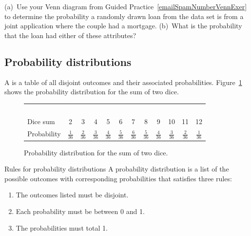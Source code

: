 \begin{exercisewrap}
\begin{nexercise}
(a)~Use your Venn diagram from Guided Practice~\ref{emailSpamNumberVennExer} to determine the
probability a randomly drawn loan from the 
data set is from a joint application where the couple had
a mortgage.
(b)~What is the probability that the loan had either of
these attributes?\footnotemark
\end{nexercise}
\end{exercisewrap}



\subsection{Probability distributions}


A  is a table of all disjoint outcomes and their associated probabilities. Figure~\ref{diceProb} shows the probability distribution for the sum of two dice. 

\begin{figure}[h] \small
\centering
\begin{tabular}{l ccc ccc ccc cc}
  \hline
  \ \vspace{-3mm} \\
Dice sum\vspace{0.3mm} & 2 & 3 & 4 & 5 & 6 & 7 & 8 & 9 & 10 & 11 & 12  \\
Probability & $\frac{1}{36}$ & $\frac{2}{36}$ & $\frac{3}{36}$ & $\frac{4}{36}$ & $\frac{5}{36}$ & $\frac{6}{36}$ & $\frac{5}{36}$ & $\frac{4}{36}$ & $\frac{3}{36}$ & $\frac{2}{36}$ & $\frac{1}{36}$\vspace{1mm} \\
   \hline
\end{tabular}
\caption{Probability distribution for the sum of two dice.}
\label{diceProb}
\end{figure}

\begin{onebox}{Rules for probability distributions}
A probability distribution is a list of the possible outcomes with corresponding probabilities that satisfies three rules: \vspace{-2mm}
\begin{enumerate}
\setlength{\itemsep}{0mm}
\item The outcomes listed must be disjoint.
\item Each probability must be between 0 and 1.
\item The probabilities must total 1. \vspace{1mm}
\end{enumerate}
\end{onebox}

